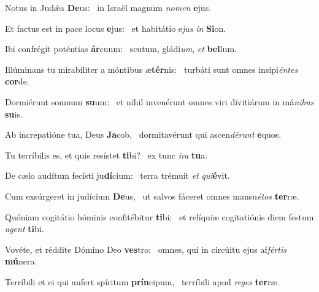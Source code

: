 \item Notus in Judǽa \textbf{De}us:~\psstar{} in Israël magnum \textit{nomen} \textbf{e}jus.
\item Et factus est in pace locus \textbf{e}jus:~\psstar{} et habitátio e\textit{jus} \textit{in} \textbf{Si}on.
\item Ibi confrégit poténtias \textbf{ár}cuum:~\psstar{} scutum, gládi\textit{um}, \textit{et} \textbf{bel}lum.
\item Illúminans tu mirabíliter a móntibus æ\textbf{tér}nis:~\psstar{} turbáti sunt omnes insipi\textit{éntes} \textbf{cor}de.
\item Dormiérunt somnum \textbf{su}um:~\psstar{} et nihil invenérunt omnes viri divitiárum in má\textit{nibus} \textbf{su}is.
\item Ab increpatióne tua, Deus \textbf{Ja}cob,~\psstar{} dormitavérunt qui ascen\textit{dérunt} \textbf{e}quos.
\item Tu terríbilis es, et quis resístet \textbf{ti}bi?~\psstar{} ex tunc \textit{ira} \textbf{tu}a.
\item De cælo audítum fecísti ju\textbf{dí}cium:~\psstar{} terra trémuit \textit{et} \textit{qui}\textbf{é}vit.
\item Cum exsúrgeret in judícium \textbf{De}us,~\psstar{} ut salvos fáceret omnes mansu\textit{étos} \textbf{ter}ræ.
\item Quóniam cogitátio hóminis confitébitur \textbf{ti}bi:~\psstar{} et relíquiæ cogitatiónis diem festum \textit{agent} \textbf{ti}bi.
\item Vovéte, et réddite Dómino Deo \textbf{ves}tro:~\psstar{} omnes, qui in circúitu ejus af\textit{fértis} \textbf{mú}nera.
\item Terríbili et ei qui aufert spíritum \textbf{prín}cipum,~\psstar{} terríbili apud \textit{reges} \textbf{ter}ræ.
